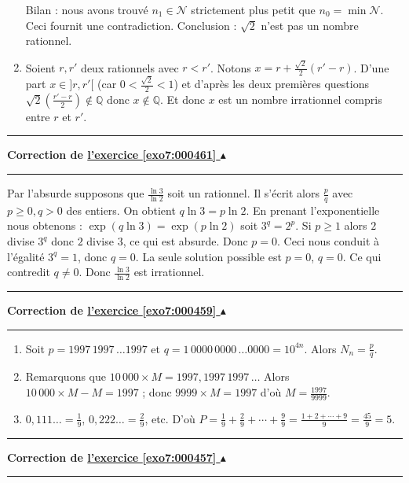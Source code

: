 \documentclass[11pt,a4paper]{article}
\newcommand{\Qq}{\mathbb{Q}} \newcommand{\Q}{\mathbb{Q}}
\renewcommand{\ge}{\geqslant} \renewcommand{\geq}{\geqslant}
\newcounter{exo}
\newcommand{\correction}[1]{\hypertarget{cor7:#1}{}\label{cor7:#1}{\bf Correction de \hyperlink{exo7:#1}{l'exercice \ref{exo7:#1} $\blacktriangle$}}\vspace{1mm}\hrule\vspace{1mm}}
\newcommand{\fincorrection}{\vspace{1mm}\hrule\vspace*{7mm}}
\begin{document}
\begin{enumerate}
Bilan : nous avons trouvé $n_1 \in \mathcal{N}$ strictement plus petit que $n_0 = \min \mathcal{N}$.
Ceci fournit une contradiction. Conclusion : $\sqrt{2}$ n'est pas un nombre rationnel.

\item Soient $r,r'$ deux rationnels avec $r<r'$. Notons $x=r + \frac{\sqrt2}{2}(r'-r)$.
D'une part $x\in]r,r'[$ (car $0 < \frac{\sqrt2}{2} < 1$) et d'apr\`es les deux premi\`eres questions
$\sqrt2\left(\frac{r'-r}{2}\right) \notin \Qq$ donc $x\notin \Qq$. Et donc $x$ est un
nombre irrationnel compris entre $r$ et $r'$.
\end{enumerate}
\fincorrection
\correction{000461}
Par l'absurde supposons que $\frac{\ln 3}{\ln 2}$ soit un rationnel.
Il s'\'ecrit alors $\frac pq$ avec $p\geqslant 0,q>0$ des entiers.
On obtient $q\ln 3=p\ln 2$. En prenant l'exponentielle nous obtenons :
$\exp (q\ln 3) = \exp(p\ln 2)$ soit
$3^q=2^p$. Si $p \ge 1$ alors $2$ divise $3^q$ donc $2$ divise $3$, ce qui est absurde.
Donc $p=0$. Ceci nous conduit à l'égalité $3^q=1$, donc $q=0$. La seule solution possible est
$p=0$, $q=0$.  Ce qui contredit $q\neq 0$.
Donc $\frac{\ln 3}{\ln 2}$ est irrationnel.
\fincorrection
\correction{000459}
\begin{enumerate}
\item
Soit $p = 1997\,1997\,\ldots 1997$ et $q = 1\, 0000\, 0000\, \ldots
0000 = 10^{4n}$. Alors $N_n = \frac pq$.
\item Remarquons que $10\,000 \times M = 1997,1997\,1997\,\ldots$ Alors
$10\,000 \times M -M=1997$ ; donc $9999\times M = 1997$ d'o\`u $M
= \frac{1997}{9999}$.
\item $0,111\ldots = \frac19$, $0,222\ldots = \frac 29$, etc.
D'o\`u $P = \frac 19 + \frac 29 +\cdots + \frac 99 =
\frac{1+2+\cdots+9}{9}= \frac {45}{9}= 5$.
\end{enumerate}
\fincorrection
\correction{000457}
\end{document}
